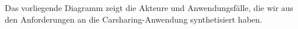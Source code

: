 Das vorliegende Diagramm zeigt die Akteure und Anwendungsfälle, die wir aus den Anforderungen an die Carsharing-Anwendung synthetisiert haben.